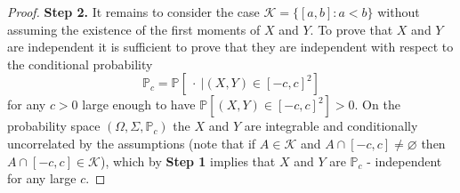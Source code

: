 \documentclass[10pt,a4paper]{amsart}
\newcommand{\KK}{\mathcal{K}}
\newcommand{\PP}{\mathbb{P}}
\begin{document}
\begin{proof}
\textbf{Step 2.} It remains to consider the case $\KK=\{[a,b]\colon a<b\}$ without assuming the existence of the first moments of $X$ and $Y$. To prove that $X$ and $Y$ are independent it is sufficient to prove that they are independent with respect to the conditional probability
$$\PP_{c}=\PP[\ \cdot\ |(X,Y)\in [-c,c]^2]$$
for any $c>0$ large enough to  have $\PP[(X,Y)\in [-c,c]^2]>0$.  On the probability space $(\Omega,\Sigma,\PP_c)$ the $X$ and $Y$ are integrable and conditionally uncorrelated by the assumptions (note that if $A\in \KK$ and $A\cap[-c,c]\neq\varnothing$ then $A\cap[-c,c]\in\KK$), which by \textbf{Step 1} implies that $X$ and $Y$ are $\PP_c$ - independent for any large $c$. \end{proof}
\end{document}
